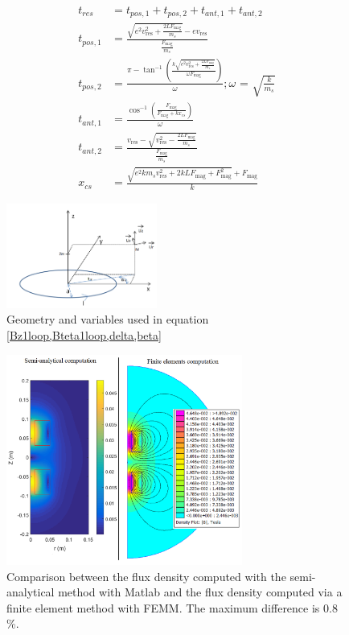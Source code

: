 \documentclass[letterpaper, 10 pt, conference]{ieeeconf}  %
\begin{document}
\begin{align}
\label{tres6}
t_{res}&=t_{pos,1}+t_{pos,2}+t_{ant,1}+t_{ant,2}\\
\label{tres1}
t_{pos,1}&=\frac{\sqrt{e^2 v_{\text{res}}^2+\frac{2 L F_{\text{mag}}}{m_s}}-e v_{\text{res}}}{\frac{F_{\text{mag}}}{m_s}}\\
t_{pos,2}&=\frac{\pi -\tan ^{-1}\left(\frac{k \sqrt{e^2 v_{\text{res}}^2+\frac{2 L F_{\text{mag}}}{m_s}}}{\omega  F_{\text{mag}}}\right)}{\omega } ; \text{$\omega $ = }
\sqrt{\frac{k}{m_s}}
\label{tres2}\\
t_{ant,1}&=\frac{\cos ^{-1}\left(\frac{F_{\text{mag}}}{F_{\text{mag}}+k x_{cs}}\right)}{\omega }
\label{tres3}\\
t_{ant,2}&=\frac{v_{\text{res}}-\sqrt{v_{\text{res}}^2-\frac{2 L F_{\text{mag}}}{m_s}}}{\frac{F_{\text{mag}}}{m_s}}
\label{tres4}\\
x_{cs}&=\frac{\sqrt{e^2 k m_s v_{\text{res}}^2+2 k L F_{\text{mag}}+F_{\text{mag}}^2}+F_{\text{mag}}}{k}
\label{tres5}
\end{align}
\begin{figure}\centering
	\includegraphics[width=140pt]{single_loop.png}
	\caption{Geometry and variables used in equation \cref{Bz1loop,Bteta1loop,delta,beta}}
	\label{single_loop_geometry}
	\vspace{-1em}
\end{figure}

\begin{figure}\centering
	\includegraphics[width=220pt]{Femm_matlab_comparison.png}
	\caption{Comparison between the flux density computed with the semi-analytical method with {\sc Matlab} and the flux density computed via a finite element method with FEMM. The maximum difference is 0.8 \%.}
	\label{Femm_matlab_comparison}
	\vspace{-1.9em}
\end{figure}
\end{document}
